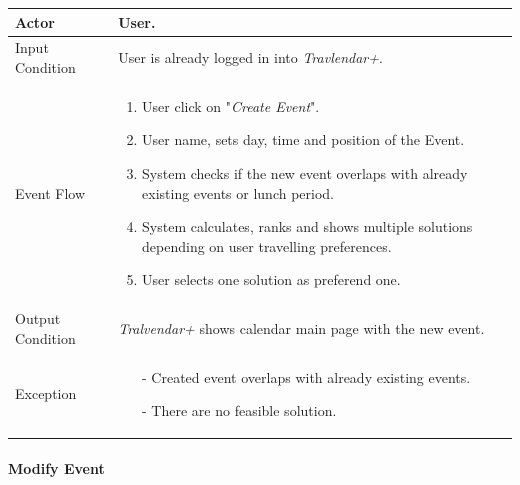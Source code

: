 		\begin{tabular}{| l | p{} | }
			\hline
			\hline
			Actor	&		User. \\
			\hline
			Input Condition		&		User is already logged in into \textit{Travlendar+}. \\
			\hline
			Event Flow		&		\begin{enumerate}
												\item User click on "\textit{Create Event}".
												\item User name, sets day, time and position of the Event.
												\item System checks if the new event overlaps with already existing events or lunch period.
												\item	 System calculates, ranks and shows multiple solutions depending on user travelling preferences.
												\item User selects one solution as preferend one.
											\end{enumerate} \\
			\hline
			Output Condition		&		\textit{Tralvendar+} shows calendar main page with the new event. \\
			\hline		
			Exception		&		\begin{itemize}
											\item[-] Created event overlaps with already existing events.
											\item[-] There are no feasible solution.
										\end{itemize} \\
			\hline
			\hline
		\end{tabular}



	\paragraph{Modify Event}
	
